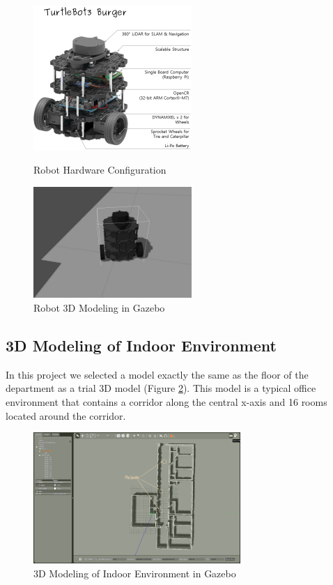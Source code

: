 \begin{figure}[htbp]
\centering
\begin{minipage}[t]{0.48\textwidth}
\centering
\includegraphics[width=6cm]{content/images/ch2/turtlebot3_burger_components.png}
\caption{Robot Hardware Configuration}
\label{fig:robot_hardware}
\end{minipage}
\begin{minipage}[t]{0.48\textwidth}
\centering
\includegraphics[width=6cm]{content/images/ch2/robot_model.jpg}
\caption{Robot 3D Modeling in Gazebo}
\label{fig:simulated_robot}
\end{minipage}
\end{figure}

\subsection{3D Modeling of Indoor Environment}

In this project we selected a model exactly the same as the floor of the department as a trial 3D model (Figure \ref{fig:modeling_environment_gazebo}).
This model is a typical office environment that contains a corridor along the central x-axis and 16 rooms located around the corridor. 

\begin{figure}[htbp]
    \centering
    \includegraphics[width = 0.7\textwidth]{content/images/ch2/gazebo_gui_environment.png}
    \caption{3D Modeling of Indoor Environment in Gazebo}
    \label{fig:modeling_environment_gazebo}
\end{figure}

